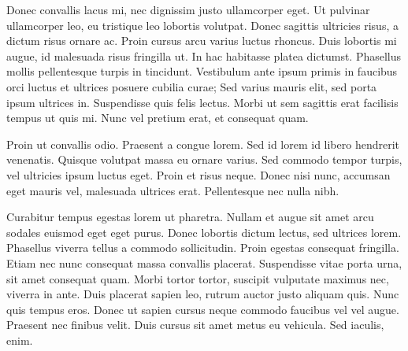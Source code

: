 \documentclass{article}
\begin{document}
Donec convallis lacus mi, nec dignissim justo ullamcorper eget. Ut pulvinar ullamcorper leo, eu tristique leo lobortis volutpat. Donec sagittis ultricies risus, a dictum risus ornare ac. Proin cursus arcu varius luctus rhoncus. Duis lobortis mi augue, id malesuada risus fringilla ut. In hac habitasse platea dictumst. Phasellus mollis pellentesque turpis in tincidunt. Vestibulum ante ipsum primis in faucibus orci luctus et ultrices posuere cubilia curae; Sed varius mauris elit, sed porta ipsum ultrices in. Suspendisse quis felis lectus. Morbi ut sem sagittis erat facilisis tempus ut quis mi. Nunc vel pretium erat, et consequat quam.

Proin ut convallis odio. Praesent a congue lorem. Sed id lorem id libero hendrerit venenatis. Quisque volutpat massa eu ornare varius. Sed commodo tempor turpis, vel ultricies ipsum luctus eget. Proin et risus neque. Donec nisi nunc, accumsan eget mauris vel, malesuada ultrices erat. Pellentesque nec nulla nibh.

Curabitur tempus egestas lorem ut pharetra. Nullam et augue sit amet arcu sodales euismod eget eget purus. Donec lobortis dictum lectus, sed ultrices lorem. Phasellus viverra tellus a commodo sollicitudin. Proin egestas consequat fringilla. Etiam nec nunc consequat massa convallis placerat. Suspendisse vitae porta urna, sit amet consequat quam. Morbi tortor tortor, suscipit vulputate maximus nec, viverra in ante. Duis placerat sapien leo, rutrum auctor justo aliquam quis. Nunc quis tempus eros. Donec ut sapien cursus neque commodo faucibus vel vel augue. Praesent nec finibus velit. Duis cursus sit amet metus eu vehicula. Sed iaculis, enim. 


\end{document}
